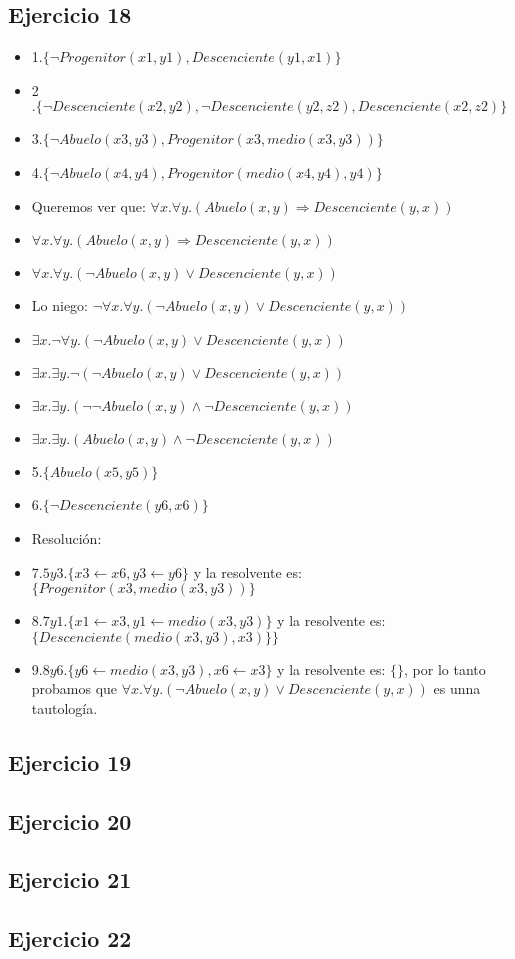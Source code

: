 \documentclass[10pt,a4paper]{article}
\begin{document}
  \subsection{Ejercicio 18}
\begin{itemize}
\item 1$.\{\neg Progenitor(x1,y1),Descenciente(y1,x1)\}$ 
\item 2$.\{\neg Descenciente(x2,y2), \neg Descenciente(y2,z2), Descenciente(x2,z2)\}$ 
\item 3$.\{\neg Abuelo(x3,y3), Progenitor(x3, medio(x3,y3))\}$ 
\item 4$.\{\neg Abuelo(x4,y4), Progenitor(medio(x4,y4),y4)\}$ 
\item Queremos ver que: $\forall x. \forall y. (Abuelo(x,y) \Rightarrow Descenciente(y,x))$ 
\item $\forall x. \forall y. (Abuelo(x,y) \Rightarrow Descenciente(y,x))$ 
\item $\forall x. \forall y. (\neg Abuelo(x,y) \vee Descenciente(y,x))$ 
\item Lo niego: $\neg \forall x. \forall y. (\neg Abuelo(x,y) \vee Descenciente(y,x))$ 
\item $\exists x. \neg \forall y. (\neg Abuelo(x,y) \vee Descenciente(y,x))$ 
\item $\exists x. \exists y. \neg (\neg Abuelo(x,y) \vee Descenciente(y,x))$ 
\item $\exists x. \exists y. (\neg \neg Abuelo(x,y) \wedge \neg Descenciente(y,x))$ 
\item $\exists x. \exists y. (Abuelo(x,y) \wedge \neg Descenciente(y,x))$ 
\item 5$.\{Abuelo(x5,y5)\} $  
\item 6$.\{\neg Descenciente(y6,x6)\} $ \\
\item Resolución: 
\item 7$. 5y3. \{x3 \leftarrow x6, y3 \leftarrow y6\}$ y la resolvente es: $\{Progenitor(x3, medio(x3,y3))\}$ 
\item 8$. 7y1. \{x1 \leftarrow x3, y1 \leftarrow medio(x3,y3)\}$ y la resolvente es: $\{Descenciente( medio(x3,y3),x3)\}\}$ 
\item 9.$ 8y6. \{y6 \leftarrow medio(x3,y3), x6 \leftarrow x3\}$ y la resolvente es: $\{\}$, por lo tanto probamos que $\forall x. \forall y. (\neg Abuelo(x,y) \vee Descenciente(y,x))$ es unna tautología.
\end{itemize}
  \subsection{Ejercicio 19}
  \subsection{Ejercicio 20}
  \subsection{Ejercicio 21}
  \subsection{Ejercicio 22}
\end{document}
